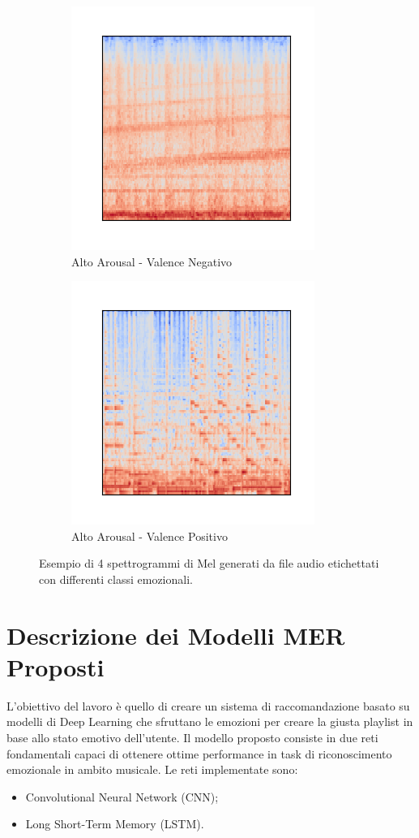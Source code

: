 \documentclass[11pt]{report}
\begin{document}
\begin{figure}
		\begin{subfigure}[t]{.45\textwidth}
         \centering
         \includegraphics[scale = 0.8]{img/Mel-2.png}
         \caption{Alto Arousal - Valence Negativo}
	\end{subfigure}
	\quad
	\begin{subfigure}[t]{.45\textwidth}
		\centering
        \includegraphics[scale = 0.8]{img/Mel-3.png}
        \caption{Alto Arousal - Valence Positivo}
	\end{subfigure}
	\caption{Esempio di 4 spettrogrammi di Mel generati da file audio etichettati con differenti classi emozionali.}
	\label{fig-spectrogram}
\end{figure}



\chapter{Descrizione dei Modelli MER Proposti}

L'obiettivo del lavoro è quello di creare un sistema di raccomandazione basato su modelli di Deep Learning che sfruttano le emozioni per creare la giusta playlist in base allo stato emotivo dell'utente. Il modello proposto consiste in due reti fondamentali capaci di ottenere ottime performance in task di riconoscimento emozionale in ambito musicale. Le reti implementate sono:
\begin{itemize}
    \item Convolutional Neural Network (CNN);
    \item Long Short-Term Memory (LSTM).
\end{itemize}
\end{document}
